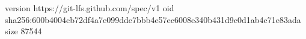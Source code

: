 version https://git-lfs.github.com/spec/v1
oid sha256:600b4004cb72df4a7e099dde7bbb4e57ec6008e340b431d9c0d1ab4c71e83ada
size 87544
